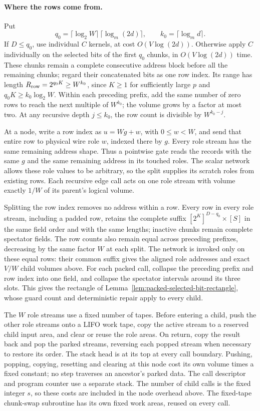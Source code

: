 \paragraph{Where the rows come from.}
Put
\[
 q_0=\lceil\log_2 W\rceil\,
       \lceil\log_m(2d)\rceil,
 \qquad k_0=\lceil\log_m d\rceil.
\]
If \(D\le q_0\), use individual \(C\) kernels, at cost \(O(V\log(2d))\).
Otherwise apply \(C\) individually on the selected bits of the first
\(q_0\) chunks, in \(O(V\log(2d))\) time.  These chunks remain a
complete consecutive address block before all the remaining chunks;
regard their concatenated bits as one row index.  Its range has
length \(R_{\rm row}=2^{q_0K}\ge W^{k_0}\), since \(K\ge1\) for sufficiently
large \(p\) and \(q_0K\ge k_0\log_2W\).  Within each preceding prefix, add
the same number of zero rows to reach the next multiple of \(W^{k_0}\);
the volume grows
by a factor at most two.  At any recursive depth \(j\le k_0\), the
row count is divisible by \(W^{k_0-j}\).

At a node, write a row index as \(u=Wg+w\), with \(0\le w<W\),
and send that entire row to physical wire role \(w\), indexed there
by \(g\).  Every role stream has the same remaining address shape.
Thus a pointwise gate reads the records with the same \(g\) and the
same remaining address in its touched roles.  The scalar network
allows these role values to be arbitrary, so the split supplies its
scratch roles from existing rows.  Each recursive edge call acts on
one role stream with volume exactly \(1/W\) of its parent's logical
volume.

Splitting the row index removes no address within a row. Every row in
every role stream, including a padded row, retains the complete suffix
\([2^K]^{D-q_0}\times[S]\) in the same field order and with the same
lengths; inactive chunks remain complete spectator fields. The row
counts also remain equal across preceding prefixes, decreasing by
the same factor \(W\) at each split. The network is invoked only on
these equal rows: their common suffix gives the aligned role addresses
and exact \(V/W\) child volumes above. For each packed call, collapse
the preceding prefix and row index into one field, and collapse the
spectator intervals around its three slots. This gives the rectangle of
Lemma~\ref{lem:packed-selected-bit-rectangle}, whose guard count and
deterministic repair apply to every child.

The \(W\) role streams use a fixed number of tapes.  Before entering a
child, push the other role streams onto a LIFO work tape, copy the
active stream to a reserved child input area, and clear or reuse the
role areas.  On return, copy the result back and pop the parked
streams, reversing each popped stream when necessary to restore its
order.  The stack head is at its top at every call boundary.  Pushing,
popping, copying, resetting and clearing at this node cost its own
volume times a fixed constant; no step traverses an ancestor's parked
data.  The call descriptor and program counter use a separate stack.
The number of child calls is the fixed integer \(s\), so these costs
are included in the node overhead above.  The fixed-tape chunk-swap
subroutine has its own fixed work areas, reused on every call.

